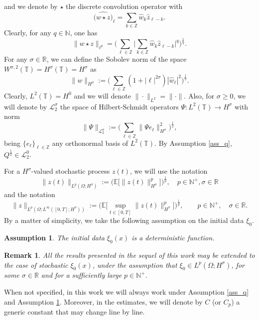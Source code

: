 \documentclass[a4paper]{amsart}
\newtheorem{remark}{Remark}[section]
\newtheorem{assumption}[theorem]{Assumption}
\begin{document}
and we denote by $\star$ the discrete convolution operator with 
$$
\widehat{\big(w\star z\big)}_{\ell} = \sum_{k\in\mathbb{Z}} \hat{w}_{k} \hat{z}_{\ell-k}.
$$
Clearly, for any $q\in\mathbb{N}$, one has
$$
\|w\star z\|_{\ell^q}=\big(\sum_{\ell\in\mathbb{Z}}\big|\sum_{k\in\mathbb{Z}} \hat{w}_{k} \hat{z}_{\ell-k}\big|^q\big)^{\frac{1}{q}}.
$$
For any $\sigma\in\mathbb{R}$, we can define the Sobolev norm of the space $W^{\sigma,2}(\mathbb{T})=H^\sigma(\mathbb{T})=H^\sigma$ as
$$
\|w\|_{H^\sigma}:=\big(\sum_{\ell\in\mathbb{Z}} (1+|\ell|^{2\sigma})|\hat{w}_{\ell}|^2\big)^{\frac{1}{2}}.
$$
Clearly, $L^2(\mathbb{T})=H^0$ and we will denote $\|\cdot \|_{L^2}=\|\cdot\|.$ 
Also, for $\sigma\ge 0$, we will denote by $\mathcal{L}_2^\sigma$ the space of Hilbert-Schmidt operators $\Psi: L^2(\mathbb{T}) \to H^\sigma$ with norm
$$
\|\Psi\|_{\mathcal{L}_2^\sigma}:=\big(\sum_{\ell\in\mathbb{Z}} \|\Psi e_{\ell}\|^2_{H^\sigma}\big)^{\frac{1}{2}},
$$
being $\{e_{\ell}\}_{\ell\in\mathbb{Z}}$ any orthonormal basis of $L^2(\mathbb{T})$. By Assumption \ref{ass_q}, $Q^{\frac{1}{2}}\in\mathcal{L}_2^0$. 

For a $H^\sigma$-valued stochastic process $z(t)$, we will use the notation
$$
\|z(t)\|_{L^{p}(\Omega; H^\sigma)}:=\big(\mathbb{E}\big[\|z(t)\|^{p}_{H^\sigma}\big]\big)^{\frac{1}{p}}, \quad p\in\mathbb{N}^+, \sigma\in\mathbb{R}
$$
and the notation
$$
\|z\|_{L^p(\Omega; L^{\infty}([0,T];H^\sigma))}:=\big(\mathbb{E}\big[\displaystyle\sup_{t\in[0,T]}\|z(t)\|_{H^\sigma}^p\big]\big)^{\frac{1}{p}}, \qquad p\in\mathbb{N}^+, \quad \sigma\in\mathbb{R}.
$$
By a matter of simplicity, we take the following assumption on the initial data $\xi_0$.
\begin{assumption}
\label{ass_data}
    The initial data $\xi_0(x)$ is a deterministic function.
\end{assumption}
\begin{remark}
    All the results presented in the sequel of this work may be extended to the case of stochastic $\xi_0(x)$, under the assumption that $\xi_0\in L^{p}(\Omega; H^\sigma)$, for some $\sigma\in\mathbb{R}$ and for a sufficiently large $p\in\mathbb{N}^+$.
\end{remark}
When not specified, in this work we will always work under Assumption \ref{ass_q} and Assumption \ref{ass_data}. Moreover, in the estimates, we will denote by $C$ (or $C_p$) a generic constant that may change line by line.
\end{document}
